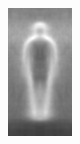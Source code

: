 \documentclass[thesis.tex]{subfiles}
\begin{document}
\begin{figure}
\begin{subfigure}[t]{0.135\textwidth}
		\caption{}
		\label{fig:hogExample7}
		\vspace{2mm}
	\end{subfigure}
	\setcounter{subfigure}{0}
	\begin{subfigure}[t]{0.13\textwidth}
		\includegraphics[width=\textwidth]{img/inriaPosTrainMeanM.png}

\end{subfigure}
\end{figure}
\end{document}
